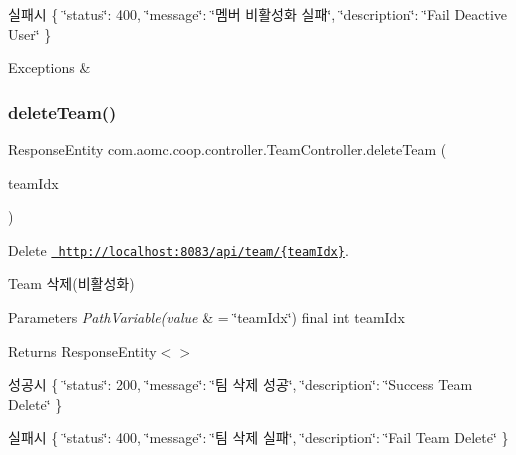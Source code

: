 실패시 \{ \char`\"{}status\char`\"{}\+: 400, \char`\"{}message\char`\"{}\+: \char`\"{}멤버 비활성화 실패\char`\"{}, \char`\"{}description\char`\"{}\+: \char`\"{}\+Fail Deactive User\char`\"{} \}


\begin{DoxyExceptions}{Exceptions}
{\em } & \\
\hline
\end{DoxyExceptions}
\mbox{\label{classcom_1_1aomc_1_1coop_1_1controller_1_1_team_controller_ad91980399a0c2439032d93aaa5131077}} 
\subsubsection{\texorpdfstring{deleteTeam()}{deleteTeam()}}
{\footnotesize\ttfamily Response\+Entity com.\+aomc.\+coop.\+controller.\+Team\+Controller.\+delete\+Team (\begin{DoxyParamCaption}\item[{@Path\+Variable(value=\char`\"{}team\+Idx\char`\"{}) final int}]{team\+Idx }\end{DoxyParamCaption})}



Delete \href{http://localhost:8083/api/team/{teamIdx}}{\texttt{ http\+://localhost\+:8083/api/team/\{team\+Idx\}}}. 

Team 삭제(비활성화)


\begin{DoxyParams}{Parameters}
{\em Path\+Variable(value} & = \char`\"{}team\+Idx\char`\"{}) final int team\+Idx\\
\hline
\end{DoxyParams}
\begin{DoxyReturn}{Returns}
Response\+Entity$<$$>$
\end{DoxyReturn}
성공시 \{ \char`\"{}status\char`\"{}\+: 200, \char`\"{}message\char`\"{}\+: \char`\"{}팀 삭제 성공\char`\"{}, \char`\"{}description\char`\"{}\+: \char`\"{}\+Success Team Delete\char`\"{} \}

실패시 \{ \char`\"{}status\char`\"{}\+: 400, \char`\"{}message\char`\"{}\+: \char`\"{}팀 삭제 실패\char`\"{}, \char`\"{}description\char`\"{}\+: \char`\"{}\+Fail Team Delete\char`\"{} \}

